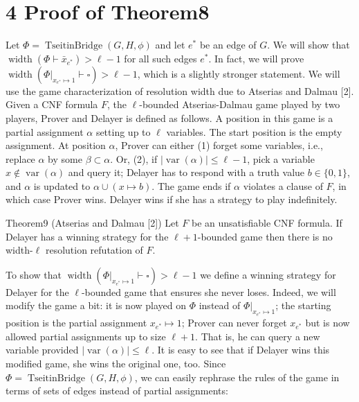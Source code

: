 \section*{4 Proof of Theorem8}
Let $\Phi=\operatorname{TseitinBridge}(G,H,\phi)$ and let $e^*$ be an edge of $G$. We will show that $\operatorname{width}(\Phi\vdash\bar x_{e^*})>\ell-1$ for all such edges $e^*$. In fact, we will prove $\operatorname{width}(\Phi|_{x_{e^*}\mapsto1}\vdash\square)>\ell-1$, which is a slightly stronger statement.
We will use the game characterization of resolution width due to Atserias and Dalmau [2]. Given a CNF formula $F$, the $\ell$-bounded Atserias-Dalmau game played by two players, Prover and Delayer is defined as follows. A position in this game is a partial assignment $\alpha$ setting up to $\ell$ variables. The start position is the empty assignment. At position $\alpha$, Prover can either (1) forget some variables, i.e., replace $\alpha$ by some $\beta\subset\alpha$. Or, (2), if $|\operatorname{var}(\alpha)|\le\ell-1$, pick a variable $x\notin\operatorname{var}(\alpha)$ and query it; Delayer has to respond with a truth value $b\in\{0,1\}$, and $\alpha$ is updated to $\alpha\cup(x\mapsto b)$. The game ends if $\alpha$ violates a clause of $F$, in which case Prover wins. Delayer wins if she has a strategy to play indefinitely.
\begin{authorclaim}{Theorem9 (Atserias and Dalmau [2])}
Let $F$ be an unsatisfiable CNF formula. If Delayer has a winning strategy for the $\ell+1$-bounded game then there is no width-$\ell$ resolution refutation of $F$.
\end{authorclaim}
To show that $\operatorname{width}(\Phi|_{x_{e^*}\mapsto1}\vdash\square)>\ell-1$ we define a winning strategy for Delayer for the $\ell$-bounded game that ensures she never loses. Indeed, we will modify the game a bit: it is now played on $\Phi$ instead of $\Phi|_{x_{e^*}\mapsto1}$; the starting position is the partial assignment $x_{e^*}\mapsto1$; Prover can never forget $x_{e^*}$ but is now allowed partial assignments up to size $\ell+1$. That is, he can query a new variable provided $|\operatorname{var}(\alpha)|\le\ell$. It is easy to see that if Delayer wins this modified game, she wins the original one, too. Since $\Phi=\operatorname{TseitinBridge}(G,H,\phi)$, we can easily rephrase the rules of the game in terms of sets of edges instead of partial assignments:
